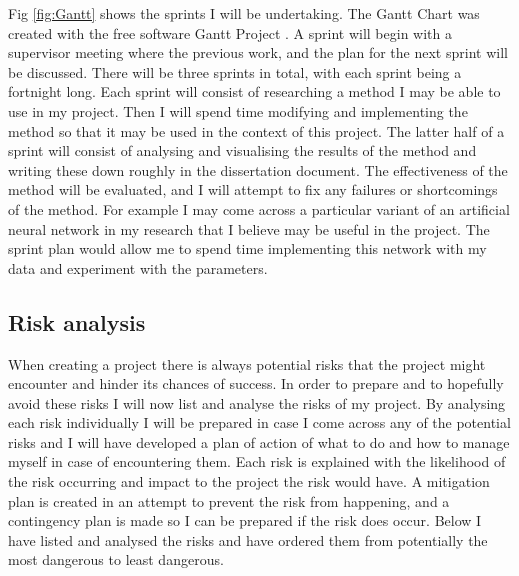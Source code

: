 \documentclass{article}
\begin{document}
Fig \ref{fig:Gantt} shows the sprints I will be undertaking.
The Gantt Chart was created with the free software Gantt Project \cite{GanttProject}.
A sprint will begin with a supervisor meeting where the previous work, and the plan for the next sprint will be discussed.
There will be three sprints in total, with each sprint being a fortnight long.
Each sprint will consist of researching a method I may be able to use in my project.
Then I will spend time modifying and implementing the method so that it may be used in the context of this project.
The latter half of a sprint will consist of analysing and visualising the results of the method and writing these down roughly in the dissertation document.
The effectiveness of the method will be evaluated, and I will attempt to fix any failures or shortcomings of the method.
For example I may come across a particular variant of an artificial neural network in my research that I believe may be useful in the project.
The sprint plan would allow me to spend time implementing this network with my data and experiment with the parameters.  




\subsection{Risk analysis}
When creating a project there is always potential risks that the project might encounter and hinder its chances of success. 
In order to prepare and to hopefully avoid these risks I will now list and analyse the risks of my project. 
By analysing each risk individually I will be prepared in case I come across any of the potential risks and I will have developed a plan of action of what to do and how to manage myself in case of encountering them. 
Each risk is explained with the likelihood of the risk occurring and impact to the project the risk would have.
A mitigation plan is created in an attempt to prevent the risk from happening, and a contingency plan is made so I can be prepared if the risk does occur.
Below I have listed and analysed the risks and have ordered them from potentially the most dangerous to least dangerous. 

\end{document}
